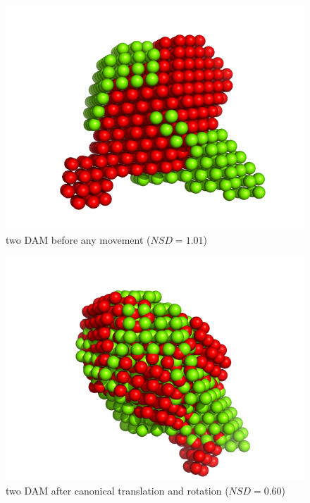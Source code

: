 \documentclass[a4paper, 11pt]{report}
\begin{document}
\begin{figure}
\centering
\includegraphics[scale=0.45]{initial.png}
\caption{two DAM before any movement ($NSD = 1.01$)}
\label{fgr:initial}
\end{figure}

\begin{figure}
\centering
\includegraphics[scale=0.45]{rotated.png}
\caption{two DAM after canonical translation and rotation ($NSD = 0.60$)}
\label{fgr:rotated}
\end{figure}
\end{document}
